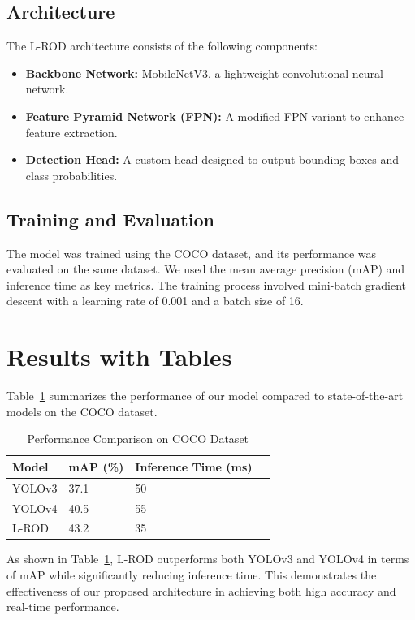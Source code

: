 \documentclass{article}
\begin{document}
\subsection{Architecture}
The L-ROD architecture consists of the following components:
\begin{itemize}
    \item \textbf{Backbone Network:} MobileNetV3, a lightweight convolutional neural network.
    \item \textbf{Feature Pyramid Network (FPN):} A modified FPN variant to enhance feature extraction.
    \item \textbf{Detection Head:} A custom head designed to output bounding boxes and class probabilities.
\end{itemize}

\subsection{Training and Evaluation}
The model was trained using the COCO dataset, and its performance was evaluated on the same dataset. We used the mean average precision (mAP) and inference time as key metrics. The training process involved mini-batch gradient descent with a learning rate of 0.001 and a batch size of 16.

\section{Results with Tables}
Table~\ref{tab:results} summarizes the performance of our model compared to state-of-the-art models on the COCO dataset.

\begin{table}[ht]
    \centering
    \caption{Performance Comparison on COCO Dataset}
    \label{tab:results}
    \begin{tabular}{@{}llll@{}}
    \toprule
    Model & mAP (\%) & Inference Time (ms) \\ \midrule
    YOLOv3 & 37.1 & 50 \\
    YOLOv4 & 40.5 & 55 \\
    L-ROD & 43.2 & 35 \\ \bottomrule
    \end{tabular}
\end{table}

As shown in Table~\ref{tab:results}, L-ROD outperforms both YOLOv3 and YOLOv4 in terms of mAP while significantly reducing inference time. This demonstrates the effectiveness of our proposed architecture in achieving both high accuracy and real-time performance.
\end{document}
